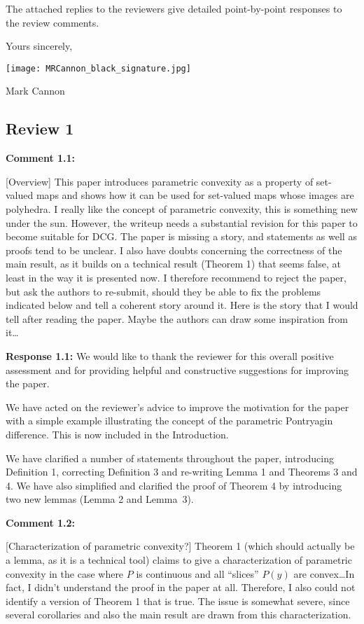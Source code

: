 \documentclass[11pt, a4paper]{article}
\newcommand{\comment}[1]{{%
\begin{sffamily}\leavevmode\color{black}#1
\end{sffamily}}}%
\def\vv{\vspace{\baselineskip}}
\def\v{\vspace{2mm}}
\begin{document}
The attached replies to the reviewers give detailed point-by-point responses to the review comments.

Yours sincerely,

\texttt{[image: MRCannon\_black\_signature.jpg]}

Mark Cannon

\newpage




\subsection*{Review 1}

\textbf{Comment 1.1:}
\comment{[Overview] This paper introduces parametric convexity as a property of set-valued maps and shows how it can be used for set-valued maps whose images are polyhedra.
I really like the concept of parametric convexity, this is something new under the sun. However, the writeup needs a substantial revision for this paper to become suitable for DCG. The paper is missing a story, and statements as well as proofs tend to be unclear. I also have doubts concerning the correctness of the main result, as it builds on a technical result (Theorem 1) that seems false, at least in the way it is presented now.
I therefore recommend to reject the paper, but ask the authors to re-submit, should they be able to fix the problems indicated below and tell a coherent story around it.
Here is the story that I would tell after reading the paper. Maybe the authors can draw some inspiration from it\dots}

\v
\textbf{Response 1.1:}
We would like to thank the reviewer for this overall positive assessment and for providing helpful and constructive suggestions for improving the paper. 

We have acted on the reviewer's advice to improve the motivation for the paper with a simple example illustrating the concept of the parametric Pontryagin difference. This is now included in the Introduction.  

We have clarified a number of statements throughout the paper, introducing Definition 1, correcting Definition 3 and re-writing Lemma 1 and Theorems 3 and 4. We have also simplified and clarified the proof of Theorem 4 by introducing two new lemmas (Lemma 2 and Lemma~3). 

\v
\textbf{Comment 1.2:}
\comment{
[Characterization of parametric convexity?] Theorem 1 (which should
actually be a lemma, as it is a technical tool) claims to give a characterization 
of parametric convexity in the case where $P$ is continuous and all ``slices'' $P(y)$ are convex\dots In fact, I didn’t understand the proof in the paper at all. Therefore, I also could not identify a version of Theorem 1 that is true. The issue is somewhat severe, since several corollaries and also the main result are drawn from this characterization.
}
\end{document}
